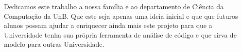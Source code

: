 Dedicamos este trabalho a nossa família e ao departamento de Ciência da Computação da UnB. Que este seja apenas uma ideia inicial e que que futuros alunos possam ajudar a enriquecer ainda mais este projeto para que a Universidade tenha sua própria ferramenta de análise de código e que sirva de modelo para outras Universidade.

